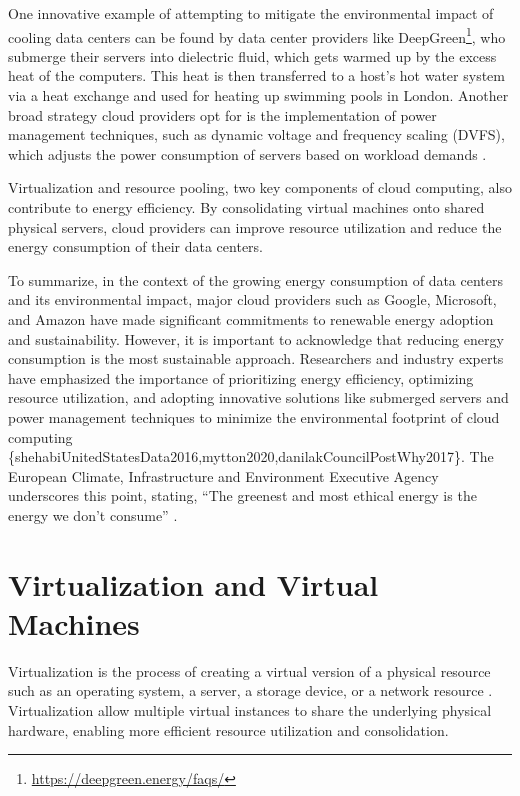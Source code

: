 \documentclass[
  table]{report}
\begin{document}
One innovative example of attempting to mitigate the environmental
impact of cooling data centers can be found by data center providers
like DeepGreen\footnote{\url{https://deepgreen.energy/faqs/}}, who
submerge their servers into dielectric fluid, which gets warmed up by
the excess heat of the computers. This heat is then transferred to a
host's hot water system via a heat exchange and used for heating up
swimming pools in London. Another broad strategy cloud providers opt for
is the implementation of power management techniques, such as dynamic
voltage and frequency scaling (DVFS), which adjusts the power
consumption of servers based on workload demands
\citep{beloglazovEnergyawareResourceAllocation2012}.

Virtualization and resource pooling, two key components of cloud
computing, also contribute to energy efficiency. By consolidating
virtual machines onto shared physical servers, cloud providers can
improve resource utilization and reduce the energy consumption of their
data centers. \citep{beloglazovEnergyawareResourceAllocation2012}

To summarize, in the context of the growing energy consumption of data
centers and its environmental impact, major cloud providers such as
Google, Microsoft, and Amazon have made significant commitments to
renewable energy adoption and sustainability. However, it is important
to acknowledge that reducing energy consumption is the most sustainable
approach. Researchers and industry experts have emphasized the
importance of prioritizing energy efficiency, optimizing resource
utilization, and adopting innovative solutions like submerged servers
and power management techniques to minimize the environmental footprint
of cloud computing
\{shehabiUnitedStatesData2016,mytton2020,danilakCouncilPostWhy2017\}.
The European Climate, Infrastructure and Environment Executive Agency
underscores this point, stating, ``The greenest and most ethical energy
is the energy we don't consume''
\citep{cappellettiGreenestMostEthical2022}.

\section{Virtualization and Virtual Machines}
\label{sect:virtual}

Virtualization is the process of creating a virtual version of a
physical resource such as an operating system, a server, a storage
device, or a network resource
\citep{chiuehSurveyVirtualizationTechnologies2005}. Virtualization allow
multiple virtual instances to share the underlying physical hardware,
enabling more efficient resource utilization and consolidation.
\end{document}
